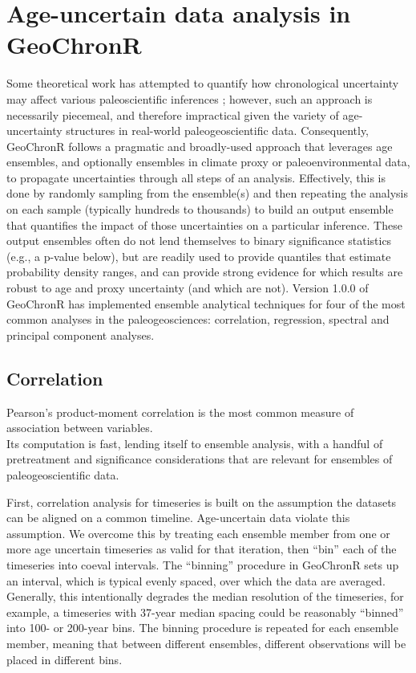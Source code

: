 \documentclass[gc, manuscript]{copernicus}
\begin{document}
\hypertarget{sec:age-uncertain-analysis}{%
\section{Age-uncertain data analysis in GeoChronR}\label{sec:age-uncertain-analysis}}

Some theoretical work has attempted to quantify how chronological uncertainty may affect various paleoscientific inferences \citep[e.g.][]{HuybersWunsch2004}; however, such an approach is necessarily piecemeal, and therefore impractical given the variety of age-uncertainty structures in real-world paleogeoscientific data.
Consequently, GeoChronR follows a pragmatic and broadly-used approach that leverages age ensembles, and optionally ensembles in climate proxy or paleoenvironmental data, to propagate uncertainties through all steps of an analysis.
Effectively, this is done by randomly sampling from the ensemble(s) and then repeating the analysis on each sample (typically hundreds to thousands) to build an output ensemble that quantifies the impact of those uncertainties on a particular inference.
These output ensembles often do not lend themselves to binary significance statistics (e.g., a p-value below), but are readily used to provide quantiles that estimate probability density ranges, and can provide strong evidence for which results are robust to age and proxy uncertainty (and which are not).
Version 1.0.0 of GeoChronR has implemented ensemble analytical techniques for four of the most common analyses in the paleogeosciences: correlation, regression, spectral and principal component analyses.

\subsection{Correlation}

Pearson's product-moment correlation is the most common measure of association between variables.\\
Its computation is fast, lending itself to ensemble analysis, with a handful of pretreatment and significance considerations that are relevant for ensembles of paleogeoscientific data.

First, correlation analysis for timeseries is built on the assumption the datasets can be aligned on a common timeline.
Age-uncertain data violate this assumption.
We overcome this by treating each ensemble member from one or more age uncertain timeseries as valid for that iteration, then ``bin'' each of the timeseries into coeval intervals.
The ``binning'' procedure in GeoChronR sets up an interval, which is typical evenly spaced, over which the data are averaged.
Generally, this intentionally degrades the median resolution of the timeseries, for example, a timeseries with 37-year median spacing could be reasonably ``binned'' into 100- or 200-year bins.
The binning procedure is repeated for each ensemble member, meaning that between different ensembles, different observations will be placed in different bins.
\end{document}
